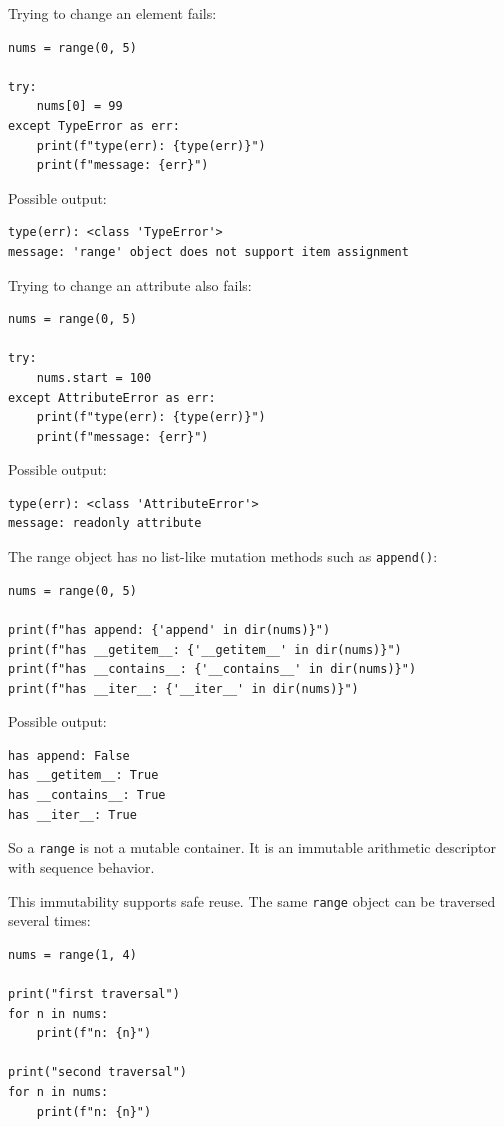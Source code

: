 \documentclass[a4paper,twoside]{report}
\begin{document}
Trying to change an element fails:

\begin{verbatim}
nums = range(0, 5)

try:
    nums[0] = 99
except TypeError as err:
    print(f"type(err): {type(err)}")
    print(f"message: {err}")
\end{verbatim}

Possible output:

\begin{verbatim}
type(err): <class 'TypeError'>
message: 'range' object does not support item assignment
\end{verbatim}

Trying to change an attribute also fails:

\begin{verbatim}
nums = range(0, 5)

try:
    nums.start = 100
except AttributeError as err:
    print(f"type(err): {type(err)}")
    print(f"message: {err}")
\end{verbatim}

Possible output:

\begin{verbatim}
type(err): <class 'AttributeError'>
message: readonly attribute
\end{verbatim}

The range object has no list-like mutation methods such as \texttt{append()}:

\begin{verbatim}
nums = range(0, 5)

print(f"has append: {'append' in dir(nums)}")
print(f"has __getitem__: {'__getitem__' in dir(nums)}")
print(f"has __contains__: {'__contains__' in dir(nums)}")
print(f"has __iter__: {'__iter__' in dir(nums)}")
\end{verbatim}

Possible output:

\begin{verbatim}
has append: False
has __getitem__: True
has __contains__: True
has __iter__: True
\end{verbatim}

So a \texttt{range} is not a mutable container. It is an immutable arithmetic descriptor with sequence behavior.

This immutability supports safe reuse. The same \texttt{range} object can be traversed several times:

\begin{verbatim}
nums = range(1, 4)

print("first traversal")
for n in nums:
    print(f"n: {n}")

print("second traversal")
for n in nums:
    print(f"n: {n}")
\end{verbatim}
\end{document}
